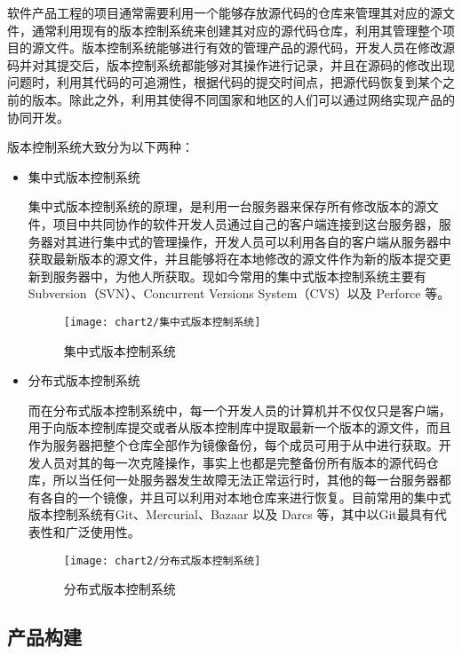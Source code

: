	软件产品工程的项目通常需要利用一个能够存放源代码的仓库来管理其对应的源文件，通常利用现有的版本控制系统来创建其对应的源代码仓库，利用其管理整个项目的源文件。版本控制系统能够进行有效的管理产品的源代码，开发人员在修改源码并对其提交后，版本控制系统都能够对其操作进行记录，并且在源码的修改出现问题时，利用其代码的可追溯性，根据代码的提交时间点，把源代码恢复到某个之前的版本。除此之外，利用其使得不同国家和地区的人们可以通过网络实现产品的协同开发。
	
	版本控制系统大致分为以下两种：
	
	\begin{itemize}
		\item 集中式版本控制系统
		
			集中式版本控制系统的原理，是利用一台服务器来保存所有修改版本的源文件，项目中共同协作的软件开发人员通过自己的客户端连接到这台服务器，服务器对其进行集中式的管理操作，开发人员可以利用各自的客户端从服务器中获取最新版本的源文件，并且能够将在本地修改的源文件作为新的版本提交更新到服务器中，为他人所获取。现如今常用的集中式版本控制系统主要有Subversion（SVN）、Concurrent Versions System（CVS）以及 Perforce 等。
			
			\begin{figure}[H] %
				\centering
				\texttt{[image: chart2/集中式版本控制系统]}
				\caption{集中式版本控制系统}
				\label{fig:集中式版本控制系统}
			\end{figure}
		\item 分布式版本控制系统
		
			而在分布式版本控制系统中，每一个开发人员的计算机并不仅仅只是客户端，用于向版本控制库提交或者从版本控制库中提取最新一个版本的源文件，而且作为服务器把整个仓库全部作为镜像备份，每个成员可用于从中进行获取。开发人员对其的每一次克隆操作，事实上也都是完整备份所有版本的源代码仓库，所以当任何一处服务器发生故障无法正常运行时，其他的每一台服务器都有各自的一个镜像，并且可以利用对本地仓库来进行恢复。目前常用的集中式版本控制系统有Git、Mercurial、Bazaar 以及 Darcs 等，其中以Git最具有代表性和广泛使用性。
			
			\begin{figure}[H] %
				\centering
				\texttt{[image: chart2/分布式版本控制系统]}
				\caption{分布式版本控制系统}
				\label{fig:分布式版本控制系统}
			\end{figure}
	\end{itemize}

	\subsection{产品构建}
	

